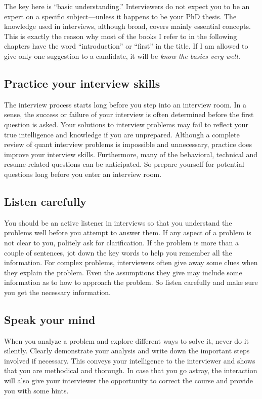 The key here is ``basic understanding.'' Interviewers do not expect you to be an expert on
a specific subject---unless it happens to be your PhD thesis. The knowledge used in
interviews, although broad, covers mainly essential concepts. This is exactly the reason
why most of the books I refer to in the following chapters have the word ``introduction''
or ``first'' in the title. If I am allowed to give only one suggestion to a candidate, it will be
\emph{know the basics very well.}

\subsection{Practice your interview skills}

The interview process starts long before you step into an interview room. In a sense, the
success or failure of your interview is often determined before the first question is asked.
Your solutions to interview problems may fail to reflect your true intelligence and
knowledge if you are unprepared. Although a complete review of quant interview
problems is impossible and unnecessary, practice does improve your interview skills.
Furthermore, many of the behavioral, technical and resume-related questions can be
anticipated. So prepare yourself for potential questions long before you enter an
interview room.

\subsection{Listen carefully}

You should be an active listener in interviews so that you understand the problems well
before you attempt to answer them. If any aspect of a problem is not clear to you,
politely ask for clarification. If the problem is more than a couple of sentences, jot down
the key words to help you remember all the information. For complex problems,
interviewers often give away some clues when they explain the problem. Even the
assumptions they give may include some information as to how to approach the problem.
So listen carefully and make sure you get the necessary information.

\subsection{Speak your mind}

When you analyze a problem and explore different ways to solve it, never do it silently.
Clearly demonstrate your analysis and write down the important steps involved if
necessary. This conveys your intelligence to the interviewer and shows that you are
methodical and thorough. In case that you go astray, the interaction will also give your
interviewer the opportunity to correct the course and provide you with some hints.

